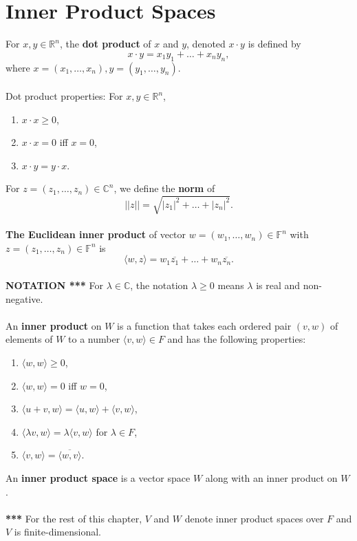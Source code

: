 \documentclass{article}
\theoremstyle{definition}
\begin{document}
\section*{Inner Product Spaces}
For $x, y \in \mathbb{R}^n$, the \textbf{dot product} of $x$ and $y$, denoted $x \cdot y$ is defined by $$x \cdot y = x_1y_1 + \dots + x_ny_n,$$ where $x = (x_1, \dots, x_n), y = (y_1, \dots, y_n)$. \\ \\
Dot product properties: For $x, y \in \mathbb{R}^n$, \begin{enumerate}
    \item $x \cdot x \geq 0$,
    \item $x \cdot x = 0$ iff $x = 0$,
    \item $x \cdot y = y \cdot x$.
\end{enumerate} $ $ \\
For $z = (z_1, \dots, z_n) \in \mathbb{C}^n$, we define the \textbf{norm} of $$||z|| = \sqrt{|z_1|^2 + \dots + |z_n|^2}.$$ \\
\textbf{The Euclidean inner product} of vector $w = (w_1, \dots, w_n) \in \mathbb{F}^n$ with $z = (z_1, \dots, z_n) \in \mathbb{F}^n$ is $$\langle w, z \rangle = w_1 \overline{z_1} + \dots + w_n \overline{z_n}.$$ \\
\textbf{NOTATION ***} For $\lambda \in \mathbb{C}$, the notation $\lambda \geq 0$ means $\lambda$ is real and non-negative. \\ \\
An \textbf{inner product} on $W$ is a function that takes each ordered pair $(v, w)$ of elements of $W$ to a number $\langle v, w \rangle \in F$ and has the following properties: \begin{enumerate}
    \item $\langle w, w \rangle \geq 0$,
    \item $\langle w, w \rangle = 0$ iff $w = 0$,
    \item $\langle u + v, w \rangle = \langle u, w \rangle + \langle v, w \rangle$,
    \item $\langle \lambda v, w \rangle = \lambda \langle v, w \rangle$ for $\lambda \in F$,
    \item $\langle v, w \rangle = \overline{\langle w, v \rangle}$.
\end{enumerate} $ $ \\
An \textbf{inner product space} is a vector space $W$ along with an inner product on $W$. \\ \\
\textbf{***} For the rest of this chapter, $V$ and $W$ denote inner product spaces over $F$ and $V$ is finite-dimensional. \\ \\
\end{document}
